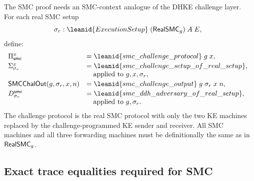 \begin{obligation}
The SMC proof needs an SMC-context analogue of the DHKE challenge layer.  For
each real SMC setup
\[
  \sigma_r :
    \leanid{ExecutionSetup}\;(\RealSMC_g)\;A\;E,
\]
define:
\[
\begin{array}{ll}
\Pi^x_{\mathsf{smc}}&
  =\leanid{smc\_challenge\_protocol}\;g\;x,\\[0.2em]
\Sigma^x_{\sigma_r}&
  =\leanid{smc\_challenge\_setup\_of\_real\_setup},\\
&
  \quad\hbox{applied to }g,x,\sigma_r,\\[0.2em]
\SMCChalOut(g,\sigma_r,x,n)&
  =\leanid{smc\_challenge\_output}\;g\;\sigma_r\;x\;n,\\[0.2em]
D^{\mathsf{smc}}_{\sigma_r}&
  =\leanid{smc\_ddh\_adversary\_of\_real\_setup},\\
&
  \quad\hbox{applied to }g,\sigma_r.
\end{array}
\]
The challenge protocol is the real SMC protocol with only the two KE machines
replaced by the challenge-programmed KE sender and receiver.  All SMC machines
and all three forwarding machines must be definitionally the same as in
\(\mathsf{RealSMC}_g\).
\end{obligation}

\subsection{Exact trace equalities required for SMC}


